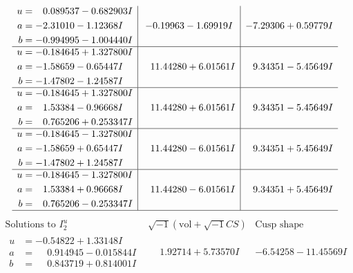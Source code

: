 \documentclass[1p]{elsarticle_modified}
\theoremstyle{definition}
\newcommand{\I}{\sqrt{-1}}
\begin{document}
$$\begin{array}{c|c|c}
\begin{aligned}
u &= \phantom{-}0.089537 - 0.682903 I \\
a &= -2.31010 - 1.12368 I \\
b &= -0.994995 - 1.004440 I\end{aligned}
 & -0.19963 - 1.69919 I & -7.29306 + 0.59779 I \\ \hline\begin{aligned}
u &= -0.184645 + 1.327800 I \\
a &= -1.58659 - 0.65447 I \\
b &= -1.47802 - 1.24587 I\end{aligned}
 & \phantom{-}11.44280 + 6.01561 I & \phantom{-}9.34351 - 5.45649 I \\ \hline\begin{aligned}
u &= -0.184645 + 1.327800 I \\
a &= \phantom{-}1.53384 - 0.96668 I \\
b &= \phantom{-}0.765206 + 0.253347 I\end{aligned}
 & \phantom{-}11.44280 + 6.01561 I & \phantom{-}9.34351 - 5.45649 I \\ \hline\begin{aligned}
u &= -0.184645 - 1.327800 I \\
a &= -1.58659 + 0.65447 I \\
b &= -1.47802 + 1.24587 I\end{aligned}
 & \phantom{-}11.44280 - 6.01561 I & \phantom{-}9.34351 + 5.45649 I \\ \hline\begin{aligned}
u &= -0.184645 - 1.327800 I \\
a &= \phantom{-}1.53384 + 0.96668 I \\
b &= \phantom{-}0.765206 - 0.253347 I\end{aligned}
 & \phantom{-}11.44280 - 6.01561 I & \phantom{-}9.34351 + 5.45649 I\\
 \hline 
 \end{array}$$\newpage$$\begin{array}{c|c|c}  
\text{Solutions to }I^u_{2}& \I (\text{vol} + \sqrt{-1}CS) & \text{Cusp shape}\\
 \hline 
\begin{aligned}
u &= -0.54822 + 1.33148 I \\
a &= \phantom{-}0.914945 - 0.015844 I \\
b &= \phantom{-}0.843719 + 0.814001 I\end{aligned}
 & \phantom{-}1.92714 + 5.73570 I & -6.54258 - 11.45569 I \\ \hline\begin{aligned}

\end{aligned}
\end{array}$$
\end{document}
